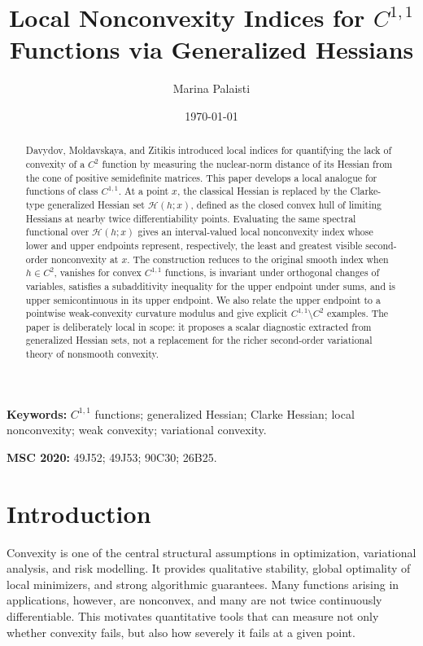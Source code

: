 \documentclass[11pt]{article}
\title{Local Nonconvexity Indices for \(C^{1,1}\) Functions via Generalized Hessians}
\author{Marina Palaisti}
\date{\today}
\numberwithin{equation}{section}
\newcommand{\Hess}{\mathcal H}
\begin{document}
	
	\maketitle
	
	\begin{abstract}
		Davydov, Moldavskaya, and Zitikis introduced local indices for quantifying the lack of convexity of a \(C^2\) function by measuring the nuclear-norm distance of its Hessian from the cone of positive semidefinite matrices. This paper develops a local analogue for functions of class \(C^{1,1}\). At a point \(x\), the classical Hessian is replaced by the Clarke-type generalized Hessian set \(\Hess(h;x)\), defined as the closed convex hull of limiting Hessians at nearby twice differentiability points. Evaluating the same spectral functional over \(\Hess(h;x)\) gives an interval-valued local nonconvexity index whose lower and upper endpoints represent, respectively, the least and greatest visible second-order nonconvexity at \(x\). The construction reduces to the original smooth index when \(h\in C^2\), vanishes for convex \(C^{1,1}\) functions, is invariant under orthogonal changes of variables, satisfies a subadditivity inequality for the upper endpoint under sums, and is upper semicontinuous in its upper endpoint. We also relate the upper endpoint to a pointwise weak-convexity curvature modulus and give explicit \(C^{1,1}\setminus C^2\) examples. The paper is deliberately local in scope: it proposes a scalar diagnostic extracted from generalized Hessian sets, not a replacement for the richer second-order variational theory of nonsmooth convexity.
	\end{abstract}
	
	\noindent\textbf{Keywords:}
	\(C^{1,1}\) functions; generalized Hessian; Clarke Hessian; local nonconvexity; weak convexity; variational convexity.
	
	\noindent\textbf{MSC 2020:}
	49J52; 49J53; 90C30; 26B25.
	
	\section{Introduction}
	
	Convexity is one of the central structural assumptions in optimization, variational analysis, and risk modelling. It provides qualitative stability, global optimality of local minimizers, and strong algorithmic guarantees. Many functions arising in applications, however, are nonconvex, and many are not twice continuously differentiable. This motivates quantitative tools that can measure not only whether convexity fails, but also how severely it fails at a given point.
	
\end{document}
